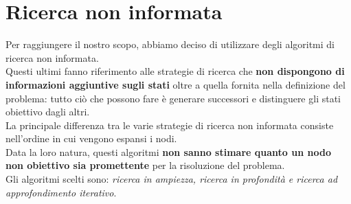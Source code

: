 \documentclass[10pt,a4paper]{article}
\begin{document}
	\section{Ricerca non informata}
	Per raggiungere il nostro scopo, abbiamo deciso di utilizzare degli algoritmi di ricerca non informata.\\
	Questi ultimi fanno riferimento alle strategie di ricerca che \textbf{non dispongono di informazioni aggiuntive sugli stati} oltre a quella fornita nella definizione del problema: tutto ciò che possono fare è generare successori e distinguere gli stati obiettivo dagli altri.\\
	La principale differenza tra le varie strategie di ricerca non informata consiste nell’ordine in cui vengono espansi i nodi.\\
	Data la loro natura, questi algoritmi \textbf{non sanno stimare quanto un nodo non obiettivo sia promettente} per la risoluzione del problema.\\
	Gli algoritmi scelti sono: \textit{ricerca in ampiezza, ricerca in profondità e ricerca ad approfondimento iterativo}.
\end{document}
